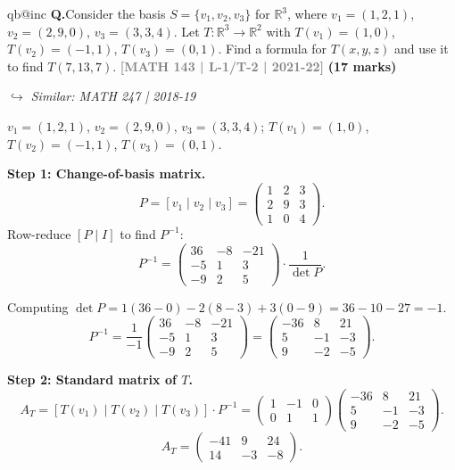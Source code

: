 \documentclass[12pt,a3paper]{article}
\makeatletter
\newcommand{\yr}[1]{\hfill\textcolor{gray}{\small\textbf{[#1]}}}
\newcommand{\mk}[1]{\textcolor{orange!70!black}{\small\textbf{(#1 marks)}}}
\newcommand{\variant}[1]{\par\vspace{1pt}\textcolor{blue!50!black}%
  {\footnotesize\textit{$\hookrightarrow$ Similar: #1}}}
\newcounter{qnum}
\newcommand{\Q}[1]{%
  \csname qb@inc\endcsname
  \needspace{4\baselineskip}
  \refstepcounter{qnum}
  \vspace{6pt}
  \noindent\textbf{Q\theqnum.}\enspace #1\par
}
\makeatother
\begin{document}
\Q{Consider the basis $S = \{v_1, v_2, v_3\}$ for $\mathbb{R}^3$, where $v_1 = (1,2,1)$, $v_2 = (2,9,0)$, $v_3 = (3,3,4)$. Let $T: \mathbb{R}^3 \to \mathbb{R}^2$ with $T(v_1) = (1,0)$, $T(v_2) = (-1,1)$, $T(v_3) = (0,1)$. Find a formula for $T(x,y,z)$ and use it to find $T(7,13,7)$.
\yr{MATH 143 | L-1/T-2 | 2021-22} \mk{17}
\variant{MATH 247 | 2018-19}}


\begin{tcolorbox}[enhanced,breakable,
  colback=cF!4,colframe=cF,boxrule=0.8pt,arc=5pt,
  title={\textbf{Answer --- $T:\mathbb{R}^3\to\mathbb{R}^2$ from Basis Values; $T(7,13,7)$}},
  fonttitle=\bfseries\color{white},colbacktitle=cF]

$v_1=(1,2,1)$, $v_2=(2,9,0)$, $v_3=(3,3,4)$; $T(v_1)=(1,0)$, $T(v_2)=(-1,1)$, $T(v_3)=(0,1)$.

\textbf{Step 1: Change-of-basis matrix.}
\[
P=[v_1\mid v_2\mid v_3]=\begin{pmatrix}1&2&3\\2&9&3\\1&0&4\end{pmatrix}.
\]
Row-reduce $[P\mid I]$ to find $P^{-1}$:
\[
P^{-1}=\begin{pmatrix}36&-8&-21\\-5&1&3\\-9&2&5\end{pmatrix}\cdot\frac{1}{\det P}.
\]

Computing $\det P=1(36-0)-2(8-3)+3(0-9)=36-10-27=-1$.
\[
P^{-1}=\frac{1}{-1}\begin{pmatrix}36&-8&-21\\-5&1&3\\-9&2&5\end{pmatrix}=\begin{pmatrix}-36&8&21\\5&-1&-3\\9&-2&-5\end{pmatrix}.
\]

\textbf{Step 2: Standard matrix of $T$.}
\[
A_T=[T(v_1)\mid T(v_2)\mid T(v_3)]\cdot P^{-1}=\begin{pmatrix}1&-1&0\\0&1&1\end{pmatrix}\begin{pmatrix}-36&8&21\\5&-1&-3\\9&-2&-5\end{pmatrix}.
\]
\[
A_T=\begin{pmatrix}-41&9&24\\14&-3&-8\end{pmatrix}.
\]


\end{tcolorbox}
\end{document}
